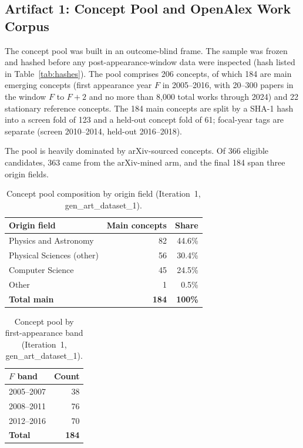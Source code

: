 \documentclass[11pt,letterpaper]{article}
\begin{document}
\subsection{Artifact 1: Concept Pool and OpenAlex Work Corpus}

The concept pool was built in an outcome-blind frame.
The sample was frozen and hashed before any post-appearance-window data were inspected (hash listed in Table~\ref{tab:hashes}).
The pool comprises 206 concepts, of which 184 are main emerging concepts (first appearance year $F$ in 2005--2016, with 20--300 papers in the window $F$ to $F+2$ and no more than 8,000 total works through 2024) and 22 stationary reference concepts.
The 184 main concepts are split by a SHA-1 hash into a screen fold of 123 and a held-out concept fold of 61; focal-year tags are separate (screen 2010--2014, held-out 2016--2018).

The pool is heavily dominated by arXiv-sourced concepts.
Of 366 eligible candidates, 363 came from the arXiv-mined arm, and the final 184 span three origin fields.

\begin{table}[!htbp]
\centering
\caption{Concept pool composition by origin field (Iteration~1, gen\_art\_dataset\_1).}
\label{tab:pool_origin}
\begin{tabular}{lrr}
\toprule
Origin field & Main concepts & Share \\
\midrule
Physics and Astronomy & 82 & 44.6\% \\
Physical Sciences (other) & 56 & 30.4\% \\
Computer Science & 45 & 24.5\% \\
Other & 1 & 0.5\% \\
\midrule
\textbf{Total main} & \textbf{184} & \textbf{100\%} \\
\bottomrule
\end{tabular}
\end{table}

\begin{table}[!htbp]
\centering
\caption{Concept pool by first-appearance band (Iteration~1, gen\_art\_dataset\_1).}
\label{tab:pool_fband}
\begin{tabular}{lr}
\toprule
$F$ band & Count \\
\midrule
2005--2007 & 38 \\
2008--2011 & 76 \\
2012--2016 & 70 \\
\midrule
\textbf{Total} & \textbf{184} \\
\bottomrule
\end{tabular}
\end{table}
\end{document}
